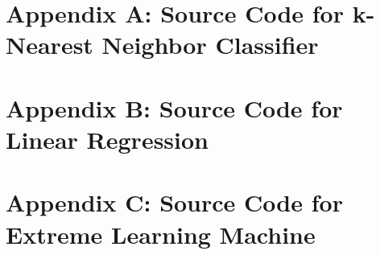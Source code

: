 \documentclass[twoside]{article}
\begin{document}
\section{Appendix A: Source Code for k-Nearest Neighbor Classifier}
\label{appendix-a}


\section{Appendix B: Source Code for Linear Regression}
\label{appendix-b}


\section{Appendix C: Source Code for Extreme Learning Machine}
\label{appendix-c}


\end{document}
